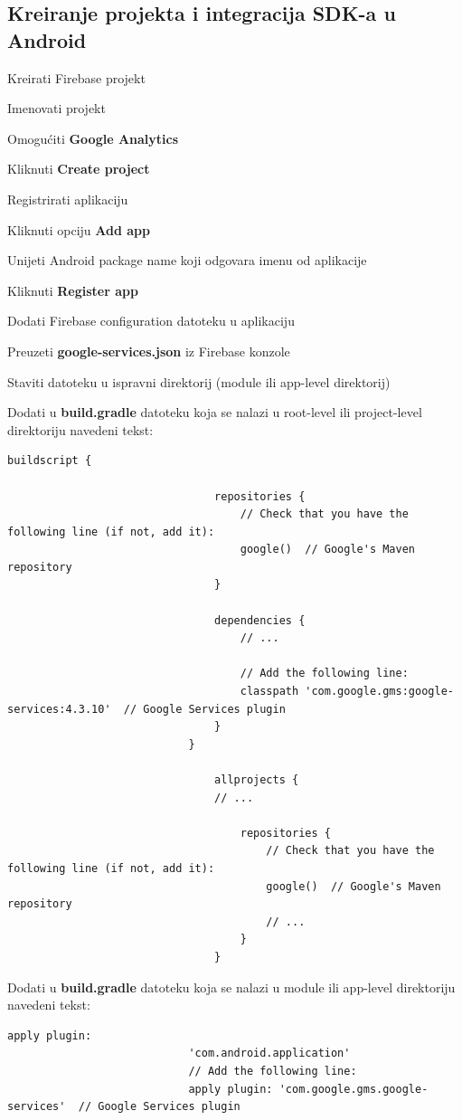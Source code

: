 		\subsection{Kreiranje projekta i integracija SDK-a u Android}
		\begin{packed_enum}
			\item Kreirati Firebase projekt
				\begin{packed_enum}
					\item Imenovati projekt
					\item Omogućiti \textbf{Google Analytics}
					\item Kliknuti \textbf{Create project}
				\end{packed_enum}
	
			\item Registrirati aplikaciju
				\begin{packed_enum}
					\item Kliknuti opciju \textbf{Add app}
					\item Unijeti Android package name koji odgovara imenu od aplikacije
					\item Kliknuti \textbf{Register app}
				\end{packed_enum}
	
			\item Dodati Firebase configuration datoteku u aplikaciju
				 \begin{packed_enum}
					\item Preuzeti \textbf{google-services.json} iz Firebase konzole
					\item Staviti datoteku u ispravni direktorij (module ili app-level direktorij)
					\item Dodati u \textbf{build.gradle} datoteku koja se nalazi u root-level ili project-level direktoriju navedeni tekst:
						\begin{lstlisting}[mathescape=true,breaklines=true,autogobble=true]
							buildscript {
	
								repositories {
									// Check that you have the following line (if not, add it):
									google()  // Google's Maven repository
								}
	
								dependencies {
									// ...
	
									// Add the following line:
									classpath 'com.google.gms:google-services:4.3.10'  // Google Services plugin
								}
							}
	
								allprojects {
								// ...
	
									repositories {
										// Check that you have the following line (if not, add it):
										google()  // Google's Maven repository
										// ...
									}
								}
						\end{lstlisting}
					\item Dodati u \textbf{build.gradle} datoteku koja se nalazi u module ili app-level direktoriju navedeni tekst:
						\begin{lstlisting}[mathescape=true,breaklines=true,autogobble=true]
							apply plugin: 
							'com.android.application'
							// Add the following line:
							apply plugin: 'com.google.gms.google-services'  // Google Services plugin
	

\end{lstlisting}
\end{packed_enum}
\end{packed_enum}
